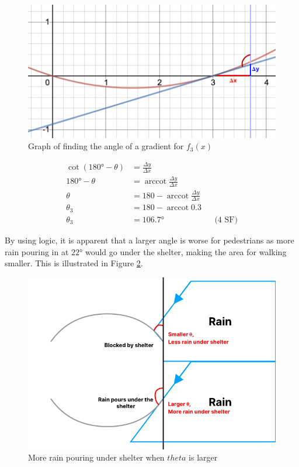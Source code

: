 \documentclass[a4paper,titlepage]{article}
\DeclareMathOperator{\arccot}{arccot}
\begin{document}
\begin{figure}[htbp]
    \centering
    \includegraphics[width=\linewidth]{gradientToAngleGraph.png}
    \caption{Graph of finding the angle of a gradient for $f_3(x)$}
    \label{fig:gradientToAngleGraph}
\end{figure}

\begin{align}
    \cot(180\si{\degree}-\theta)&=\frac{\Delta y}{\Delta x}\\
    180\si{\degree}-\theta&=\arccot\frac{\Delta y}{\Delta x}\\
    \theta&=180-\arccot\frac{\Delta y}{\Delta x}\\
    \theta_3&=180-\arccot0.3\\
    \theta_3&=106.7\si{\degree}&&\text{(4 SF)}
\end{align}

By using logic, it is apparent that a larger angle is worse for pedestrians as more rain pouring in at $22\si{\degree}$ would go under the shelter, making the area for walking smaller. This is illustrated in Figure \ref{fig:rainPourUnderShelter}.

\begin{figure}[htbp]
    \centering
    \includegraphics[width=\textwidth]{rainPourUnderShelter.png}
    \caption{More rain pouring under shelter when $theta$ is larger}
    \label{fig:rainPourUnderShelter}
\end{figure}
\end{document}
